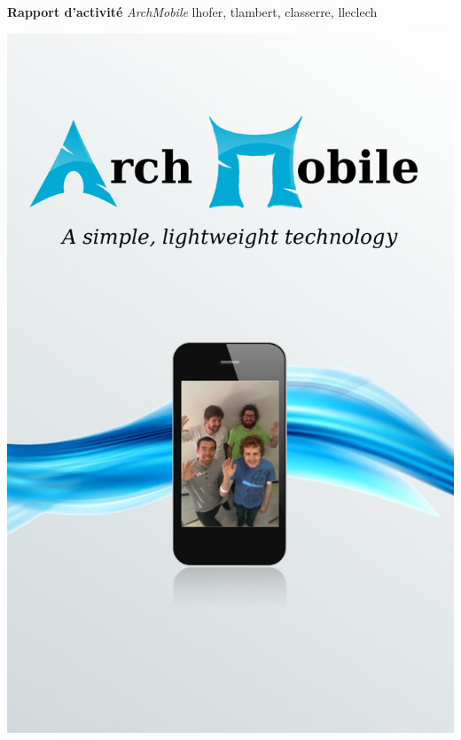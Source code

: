\documentclass[a4paper]{article}
\def\projet{Rapport d'activité}
\def\titre{ArchMobile}
\def\others{lhofer, tlambert, classerre, lleclech}
\begin{document}
\begin{center}
\vspace*{10mm}
\Huge{\bfseries \sffamily \projet}
\vskip 20mm
\huge{ \itshape \titre}
\vskip 10mm
\huge{ \sffamily \others}
\vskip 5mm
\end{center}


\vskip 15mm
\begin{minipage}{.49\textwidth}
  \includegraphics[width=\linewidth]{flyer}
\end{minipage}
\end{document}
